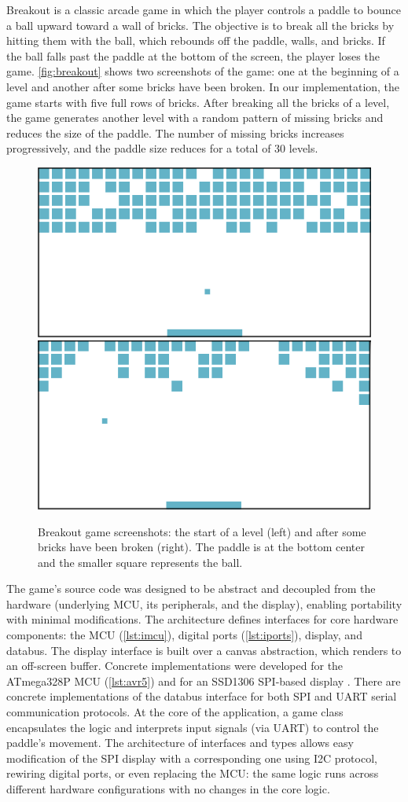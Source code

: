 \documentclass[sigconf]{acmart}
\begin{document}
Breakout is a classic arcade game in which the player controls a paddle to bounce a ball upward toward a wall of bricks. The objective is to break all the bricks by hitting them with the ball, which rebounds off the paddle, walls, and bricks. If the ball falls past the paddle at the bottom of the screen, the player loses the game. \autoref{fig:breakout} shows two screenshots of the game: one at the beginning of a level and another after some bricks have been broken. In our implementation, the game starts with five full rows of bricks. After breaking all the bricks of a level, the game generates another level with a random pattern of missing bricks and reduces the size of the paddle. The number of missing bricks increases progressively, and the paddle size reduces for a total of 30 levels. 

\begin{figure}[bp]
\includegraphics[width=.23\textwidth]{breakout1}\hspace{5pt}\includegraphics[width=.23\textwidth]{breakout2}
\caption{Breakout game screenshots: the start of a level (left) and after some bricks have been broken (right). The paddle is at the bottom center and the smaller square represents the ball.}
\label{fig:breakout}
\end{figure}

The game's source code was designed to be abstract and decoupled from the hardware (underlying MCU, its peripherals, and the display), enabling portability with minimal modifications. The architecture defines interfaces for core hardware components: the MCU (\autoref{lst:imcu}), digital ports (\autoref{lst:iports}), display, and databus. The display interface is built over a canvas abstraction, which renders to an off-screen buffer. Concrete implementations were developed for the ATmega328P MCU \cite{atmel328p} (\autoref{lst:avr5}) and for an SSD1306 SPI-based display \cite{ssd1306}. There are concrete implementations of the databus interface for both SPI and UART serial communication protocols. At the core of the application, a game class encapsulates the logic and interprets input signals (via UART) to control the paddle’s movement. The architecture of interfaces and types allows easy modification of the SPI display with a corresponding one using I2C protocol, rewiring digital ports, or even replacing the MCU: the same logic runs across different hardware configurations with no changes in the core logic.
\end{document}
